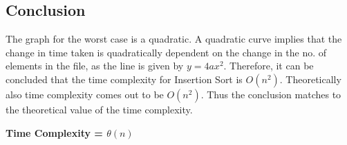 \documentclass{article}
\begin{document}
\subsection{Conclusion}
The graph for the worst case is a quadratic. A quadratic curve implies that
the change in time taken is quadratically dependent on the change in the no. of elements in the file,
as the line is given by $y = 4ax^2$.
Therefore, it can be concluded that the time complexity for Insertion Sort is $O(n^2)$.
Theoretically also time complexity comes out to be $O(n^2)$. Thus the conclusion matches to the theoretical
value of the time complexity.

\textbf{Time Complexity = $\theta(n)$}
\end{document}
